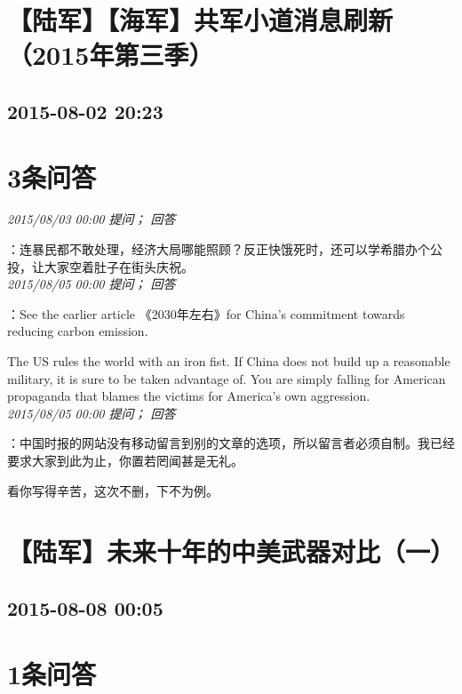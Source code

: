 \documentclass[twocolumn]{ctexart}
\begin{document}
\section{【陆军】【海军】共军小道消息刷新（2015年第三季）}
\subsection{2015-08-02 20:23}


\section{3条问答}

\textit{\hfill\noindent\small 2015/08/03 00:00 提问； 回答}

：连暴民都不敢处理，经济大局哪能照顾？反正快饿死时，还可以学希腊办个公投，让大家空着肚子在街头庆祝。\\

\textit{\hfill\noindent\small 2015/08/05 00:00 提问； 回答}

：See the earlier article 《2030年左右》for China's commitment towards reducing carbon emission.

The US rules the world with an iron fist. If China does not build up a reasonable military, it is sure to be taken advantage of. You are simply falling for American propaganda that blames the victims for America's own aggression.\\

\textit{\hfill\noindent\small 2015/08/05 00:00 提问； 回答}

：中国时报的网站没有移动留言到别的文章的选项，所以留言者必须自制。我已经要求大家到此为止，你置若罔闻甚是无礼。

看你写得辛苦，这次不删，下不为例。\\


\section{【陆军】未来十年的中美武器对比（一）}
\subsection{2015-08-08 00:05}


\section{1条问答}
\end{document}
